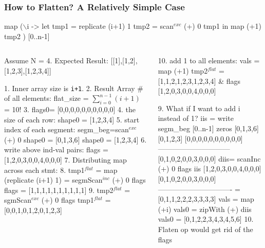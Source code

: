 \documentclass{beamer}
\renewcommand{\emph}[1]{\textcolor{structure}{#1}}
\newcommand{\emp}[1]{\textcolor{DikuRed}{ #1}}
\newcommand{\mymath}[1]{$ #1 $}
\newcommand{\myindx}[1]{_{#1}}
\newcommand{\myindu}[1]{^{#1}}
\begin{document}
\begin{frame}[fragile,t]
  \frametitle{How to Flatten? A Relatively Simple Case}
\vspace{-2ex}
\begin{colorcode}
\emph{map} (\mymath{\backslash}i -> let tmp1 = \alert{replicate (i+1) 1}
               tmp2 = \alert{scan\mymath{\myindu{exc}} (+) 0 tmp1}
           in         \alert{map (+1) tmp2}     ) [0..n-1]
\end{colorcode}
\begin{columns}
\begin{colorcode}[fontsize=\scriptsize]
Assume N = 4. Expected Result:
\emph{[[1],[1,2],[1,2,3],[1,2,3,4]]}

1. Inner array size is {\tt i+1}.
2. Result Array \# of all elements:
    flat\_size = \mymath{\sum\myindx{i=0}\myindu{n-1}(i+1)} = 10!
3. flags0= [0,0,0,0,0,0,0,0,0,0]
4. the size of each row:
   shape0  = [1,2,3,4]
5. start index of each segment:
   segm_beg=scan\mymath{\myindu{exc}} (+) 0 shape0
           = [0,1,3,6]
   shape0  = [1,2,3,4]
6. write above ind-val pairs:
   flags = [1,2,0,3,0,0,4,0,0,0]
7. \emph{Distributing map across each stmt:}
8. tmp1\mymath{\myindu{flat}} = map (replicate (i+1) 1) = 
          segmScan\mymath{\myindu{inc}} (+) 0 flags flags
   = [1,1,1,1,1,1,1,1,1,1]
9. tmp2\mymath{\myindu{flat}} = sgmScan\mymath{\myindu{exc}} (+) 0 flags tmp1\mymath{\myindu{flat}}
   = [0,0,1,0,1,2,0,1,2,3]
\end{colorcode}
\begin{colorcode}[fontsize=\scriptsize]
10. \emp{add 1 to all elements:}
   vals = map (+1) tmp2\mymath{\myindu{flat}}
        =  \emph{[1,1,2,1,2,3,1,2,3,4]}
   \& flags \emph{[1,2,0,3,0,0,4,0,0,0]}

9. \alert{What if I want to add i instead of 1?}\pause
   \emp{iis = write segm_beg [0..n-1] zeros}
           [0,1,3,6] [0,1,2,3]
           [0,0,0,0,0,0,0,0,0,0]
         ------------------------------
           [0,1,0,2,0,0,3,0,0,0]
   \emp{diis= scanInc (+) 0 flags iis}
         [1,2,0,3,0,0,4,0,0,0]
         [0,1,0,2,0,0,3,0,0,0]
        -------------------------------
       = [0,1,1,2,2,2,3,3,3,3]
   \emp{vals = map (+i) vals0}
        \emp{= zipWith (+) diis vals0}
        = [0,1,2,2,3,4,3,4,5,6]
10. \emp{Flaten op would get rid of the flags}
\end{colorcode}
\end{columns}

\end{frame}
\end{document}
